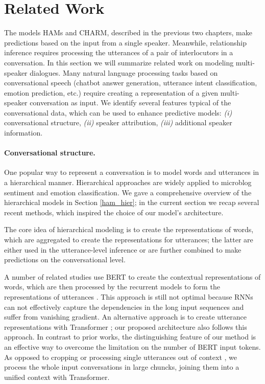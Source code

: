 \section{Related Work}

The models HAMs and CHARM, described in the previous two chapters, make predictions based on the input from a single speaker. Meanwhile, relationship inference requires processing the utterances of a pair of interlocutors in a conversation.
In this section we will summarize related work on modeling multi-speaker dialogues. Many natural language processing tasks based on conversational speech (chatbot answer generation, utterance intent classification, emotion prediction, etc.) require creating a representation of a given multi-speaker conversation as input.
We identify several features typical of the conversational data, which can be used to enhance predictive models: \textit{(i)} conversational structure, \textit{(ii)} speaker attribution, \textit{(iii)} additional speaker information. 

\paragraph{Conversational structure.} 
One popular way to represent a conversation is to model words and utterances in a hierarchical manner. Hierarchical approaches are widely applied to microblog sentiment and emotion classification. We gave a comprehensive overview of the hierarchical models in Section \ref{ham_hier}; in the current section we recap several recent methods, which inspired the choice of our model's architecture.

The core idea of hierarchical modeling is to create the representations of words, which are aggregated to create the representations for utterances; the latter are either used in the utterance-level inference or are further combined to make predictions on the conversational level. 

A number of related studies use BERT to create the contextual representations of words, which are then processed by the recurrent models to form the representations of utterances \cite{lei2019bert, ma2020han}. This approach is still not optimal because RNNs can not effectively capture the dependencies in the long input sequences and suffer from vanishing gradient. An alternative approach is to create utterance representations with Transformer \cite{shan2020contextual, li2020hierarchical}; our proposed architecture also follows this approach. In contrast to prior works, the distinguishing feature of our method is an effective way to overcome the limitation on the number of BERT input tokens. As opposed to cropping or processing single utterances out of context \cite{li2020hierarchical, shan2020contextual}, we process the whole input conversations in large chuncks, joining them into a unified context with Transformer.

